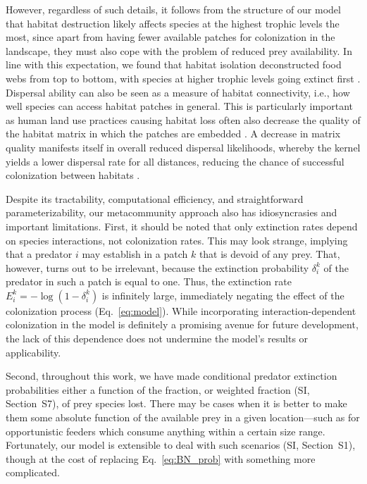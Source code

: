 \documentclass[11pt]{article}
\newcommand{\SI}{SI}
\begin{document}
However, regardless of such details, it follows from the structure of our model that habitat destruction likely affects species at the highest trophic levels the most, since apart from having fewer available patches for colonization in the landscape, they must also cope with the problem of reduced prey availability. In line with this expectation, we found that habitat isolation deconstructed food webs from top to bottom, with species at higher trophic levels going extinct first \citep{Ryser2019, McWilliams2019}. Dispersal ability can also be seen as a measure of habitat connectivity, i.e., how well species can access habitat patches in general. This is particularly important as human land use practices causing habitat loss often also decrease the quality of the habitat matrix in which the patches are embedded \citep{Bonte2012}. A decrease in matrix quality manifests itself in overall reduced dispersal likelihoods, whereby the kernel yields a lower dispersal rate for all distances, reducing the chance of successful colonization between habitats \citep{Eklof2012}. 

Despite its tractability, computational efficiency, and straightforward parameterizability, our metacommunity approach also has idiosyncrasies and important limitations. First, it should be noted that only extinction rates depend on species interactions, not colonization rates. This may look strange, implying that a predator $i$ may establish in a patch $k$ that is devoid of any prey. That, however, turns out to be irrelevant, because the extinction probability $\delta_i^k$ of the predator in such a patch is equal to one. Thus, the extinction rate $E_i^k = -\log(1-\delta_i^k)$ is infinitely large, immediately negating the effect of the colonization process (Eq.~\ref{eq:model}). While incorporating interaction-dependent colonization in the model is definitely a promising avenue for future development, the lack of this dependence does not undermine the model's results or applicability.

Second, throughout this work, we have made conditional predator extinction probabilities either a function of the fraction, or weighted fraction (\SI, Section~S7), of prey species lost. There may be cases when it is better to make them some absolute function of the available prey in a given location---such as for opportunistic feeders which consume anything within a certain size range. Fortunately, our model is extensible to deal with such scenarios (\SI, Section~S1), though at the cost of replacing Eq.~\ref{eq:BN_prob} with something more complicated.
\end{document}
